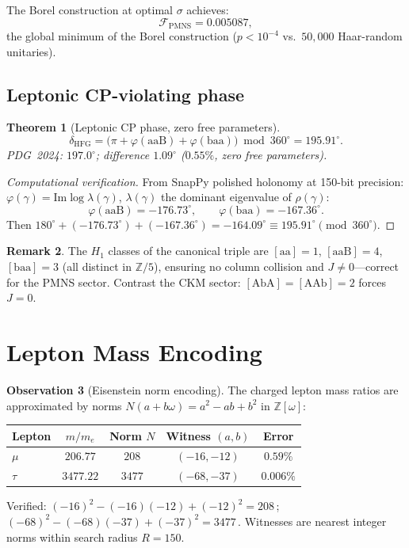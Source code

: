 \documentclass[11pt,a4paper]{article}
\newtheorem{theorem}{Theorem}
\theoremstyle{definition}
\newtheorem{observation}[theorem]{Observation}
\newtheorem{remark}[theorem]{Remark}
\newcommand{\Zom}{\mathbb{Z}[\omega]}
\newcommand{\Zfive}{\mathbb{Z}/5}
\begin{document}
The Borel construction at optimal $\sigma$ achieves:
\[
  \mathcal{F}_{\mathrm{PMNS}} = 0.005087,
\]
the global minimum of the Borel construction
($p<10^{-4}$ vs.\ $50{,}000$ Haar-random unitaries).

\subsection{Leptonic CP-violating phase}
\label{subsec:cp}

\begin{theorem}[Leptonic CP phase, zero free parameters]
\label{thm:cp}
\[
  \boxed{
    \delta_{\mathrm{HFG}}
    = \bigl(\pi + \varphi(\mathrm{aaB}) + \varphi(\mathrm{baa})\bigr)
      \bmod 360^\circ
    = 195.91^\circ.
  }
\]
PDG~2024: $197.0^\circ$; difference $1.09^\circ$ ($0.55\%$,
zero free parameters).
\end{theorem}

\begin{proof}[Computational verification]
From SnapPy polished holonomy at 150-bit precision:
$\varphi(\gamma)=\mathrm{Im}\log\lambda(\gamma)$,
$\lambda(\gamma)$ the dominant eigenvalue of $\rho(\gamma)$:
\[
  \varphi(\mathrm{aaB}) = -176.73^\circ,
  \qquad
  \varphi(\mathrm{baa}) = -167.36^\circ.
\]
Then $180^\circ + (-176.73^\circ) + (-167.36^\circ)
= -164.09^\circ \equiv 195.91^\circ \pmod{360^\circ}$.
\end{proof}

\begin{remark}
The $H_1$ classes of the canonical triple are
$[\mathrm{aa}]=1$, $[\mathrm{aaB}]=4$, $[\mathrm{baa}]=3$
(all distinct in $\Zfive$), ensuring no column collision
and $J\neq0$---correct for the PMNS sector.
Contrast the CKM sector: $[\mathrm{AbA}]=[\mathrm{AAb}]=2$
forces $J=0$.
\end{remark}

\section{Lepton Mass Encoding}
\label{sec:masses}

\begin{observation}[Eisenstein norm encoding]
The charged lepton mass ratios are approximated by norms
$N(a+b\omega)=a^2-ab+b^2$ in $\Zom$:

\begin{center}
\begin{tabular}{lcccc}
\toprule
Lepton & $m/m_e$ & Norm $N$ & Witness $(a,b)$ & Error \\
\midrule
$\mu$ & $206.77$ & $208$ & $(-16,-12)$ & $0.59\%$ \\
$\tau$ & $3477.22$ & $3477$ & $(-68,-37)$ & $0.006\%$ \\
\bottomrule
\end{tabular}
\end{center}

Verified: $(-16)^2-(-16)(-12)+(-12)^2=208$\,\checkmark;
$(-68)^2-(-68)(-37)+(-37)^2=3477$\,\checkmark.
Witnesses are nearest integer norms within search radius $R=150$.
\end{observation}
\end{document}
